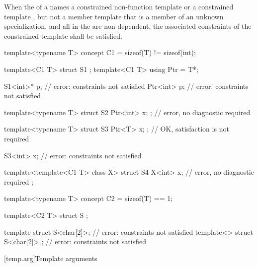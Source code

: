 \pnum
When the 
of a 
names a constrained non-function template
or
a constrained template ,
but not a member template
that is a member of an unknown specialization,
and
all 
in the 
are non-dependent,
the associated constraints
of the constrained template
shall be satisfied.
\begin{example}
\begin{codeblock}
template<typename T> concept C1 = sizeof(T) != sizeof(int);

template<C1 T> struct S1 { };
template<C1 T> using Ptr = T*;

S1<int>* p;                         // error: constraints not satisfied
Ptr<int> p;                         // error: constraints not satisfied

template<typename T>
struct S2 { Ptr<int> x; };          // error, no diagnostic required

template<typename T>
struct S3 { Ptr<T> x; };            // OK, satisfaction is not required

S3<int> x;                          // error: constraints not satisfied

template<template<C1 T> class X>
struct S4 {
  X<int> x;                         // error, no diagnostic required
};

template<typename T> concept C2 = sizeof(T) == 1;

template<C2 T> struct S { };

template struct S<char[2]>;         // error: constraints not satisfied
template<> struct S<char[2]> { };   // error: constraints not satisfied
\end{codeblock}
\end{example}

[temp.arg]{Template arguments}

